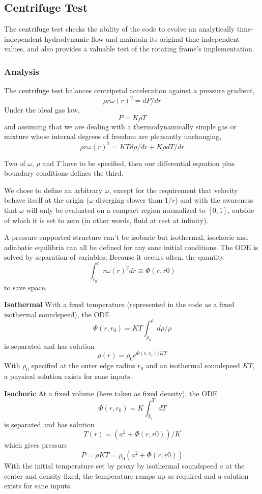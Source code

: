 

\subsection{Centrifuge Test}

The centrifuge test checks the ability of the code to evolve an analytically time-independent
hydrodynamic flow and maintain its original time-independent values, and also provides a
valuable test of the rotating frame's implementation.

\subsubsection{Analysis}

The centrifuge test balances centripetal acceleration against a pressure gradient,
\[ \rho r \omega(r)^2 = dP/dr \]
Under the ideal gas law,
\[ P = K \rho T \]
and assuming that we are dealing with a thermodynamically simple gas or mixture whose 
internal degrees of freedom are pleasantly unchanging,
\[ \rho r \omega(r)^2 = K T d\rho/dr + K \rho dT/dr \]

Two of $\omega$, $\rho$ and $T$ have to be specified, then our differential equation
plus boundary conditions defines the third.

We chose to define an arbitrary $\omega$, except for the requirement that velocity behave
itself at the origin ($\omega$ diverging slower than $1/r$) and with the awareness that
 $\omega$ will only be evaluated on a compact region normalized to $[0,1]$, outside of
which it is set to zero (in other words, fluid at rest at infinity).

A pressure-supported structure can't be isobaric but isothermal, isochoric and adiabatic equilibria
can all be defined for any sane initial conditions. The ODE is solved by separation
of variables; Because it occurs often, the quantity
\[ \int_{r_0}^r r \omega(r)^2 dr \equiv \Phi(r,r0) \]
to save space.

\textbf{Isothermal}
With a fixed temperature (represented in the code as a fixed isothermal soundspeed), the ODE
\[ \Phi(r,r_0) = K T \int_{\rho_0}^\rho d\rho / \rho \]
is separated and has solution
\[ \rho(r)  = \rho_0 e^{\Phi(r,r_0)/KT} \]
With $\rho_0$ specified at the outer edge radius $r_0$ and an isothermal soundspeed $KT$,
a physical solution exists for sane inputs.

\textbf{Isochoric}
At a fixed volume (here taken as fixed density), the ODE
\[ \Phi(r,r_0) = K \int_{T_0}^T dT \]
is separated and has solution
\[ T(r) = (a^2 + \Phi(r,r0))/K \]
which gives pressure
\[ P = \rho K T = \rho_0 (a^2 + \Phi(r,r0)) \]
With the initial temperature set by proxy by isothermal soundspeed $a$ at the center
and density fixed, the temperature ramps up as required and a solution exists for sane
inputs.

